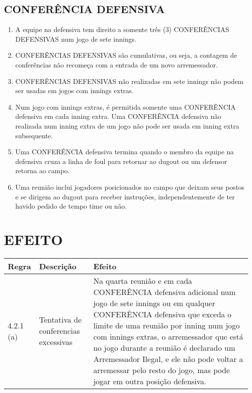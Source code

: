 \subsection{CONFERÊNCIA DEFENSIVA}
\begin{enumerate}[label=(\alph*)]
	\item  A equipe na defensiva tem direito a somente três (3) CONFERÊNCIAS
	DEFENSIVAS num jogo de sete \glspl{inning}.
	\item  CONFERÊNCIAS DEFENSIVAS são cumulativas, ou seja, a contagem de conferências não recomeça com a entrada de um novo arremessador.
	\item  CONFERÊNCIAS DEFENSIVAS não realizadas em sete \glspl{inning} não podem ser usadas em jogos com \glspl{inning} extras.
	\item  Num jogo com \glspl{inning} extras, é permitida somente uma CONFERÊNCIA  defensiva em cada \gls{inning} extra. Uma CONFERÊNCIA defensiva não realizada num \gls{inning} extra de um jogo não pode ser usada em \gls{inning} extra  subsequente.
	\item  Uma CONFERÊNCIA defensiva termina quando o membro da equipe na  defensiva cruza a linha de \gls{foul} para retornar ao \gls{dugout} ou um defensor retorna  ao campo.

	\item  Uma reunião inclui jogadores posicionados no campo que deixam seus postos e se dirigem ao \gls{dugout} para receber instruções, independentemente de ter havido pedido de tempo \gls{time} ou não.
\end{enumerate}

\section*{EFEITO}

{\footnotesize\begin{tabular}{p{15mm}p{60mm}p{90mm}}
		Regra& Descrição & Efeito\\\hline 4.2.1 (a) & Tentativa de conferencias excessivas

		&

		Na quarta reunião e em cada CONFERÊNCIA defensiva adicional num jogo de sete \glspl{inning} ou em qualquer CONFERÊNCIA defensiva que exceda o limite de uma reunião por \gls{inning} num jogo com \glspl{inning} extras, o arremessador que está no jogo durante a reunião é declarado um Arremessador Ilegal, e ele não pode voltar a arremessar pelo resto do jogo, mas pode jogar em outra posição defensiva.

\end{tabular}}


